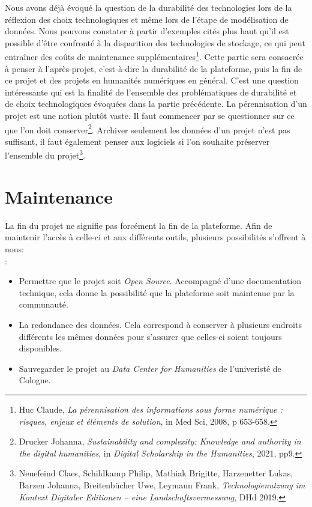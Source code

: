 Nous avons déjà évoqué la question de la durabilité des technologies lors de la réflexion des choix technologiques et même lors de l’étape de modélisation de données. Nous pouvons constater à partir d’exemples cités plus haut qu'il est possible d’être confronté à la disparition des technologies de stockage, ce qui peut entraîner des coûts de maintenance supplémentaires\footnote{Huc Claude, \textit{La pérennisation des informations sous forme numérique : risques, enjeux et éléments de solution}, in Med Sci, 2008, p 653-658.}. Cette partie sera consacrée à penser à l’après-projet, c’est-à-dire la durabilité de la plateforme, puis la fin de ce projet et des projets en humanités numériques en général. C’est une question intéressante qui est la finalité de l’ensemble des problématiques de durabilité et de choix technologiques évoquées dans la partie précédente.
La pérennisation d’un projet est une notion plutôt vaste. Il faut commencer par se questionner sur ce que l’on doit conserver\footnote{Drucker Johanna, \textit{Sustainability and complexity: Knowledge and authority in the digital humanities}, in \textit{Digital Scholarship in the Humanities}, 2021, pp9.}. Archiver seulement les données d’un projet n’est pas suffisant, il faut également penser aux logiciels si l’on souhaite préserver l’ensemble du projet\footnote{Neuefeind Claes, Schildkamp Philip, Mathiak Brigitte, Harzenetter Lukas, Barzen Johanna, Breitenbücher Uwe, Leymann Frank, \textit{Technologienutzung im Kontext Digitaler Editionen – eine Landschaftsvermessung}, DHd 2019.}.

\chapter{Maintenance}

La fin du projet ne signifie pas forcément la fin de la plateforme. Afin de maintenir l’accès à celle-ci et aux différents outils, plusieurs possibilités s’offrent à nous: \\: 
\begin{itemize}
\item Permettre que le projet soit \textit{Open Source}. Accompagné d'une documentation technique, cela donne la possibilité que la plateforme soit maintenue par la communauté.
\item La redondance des données. Cela correspond à conserver à plusieurs endroits différents les mêmes données pour s'assurer que celles-ci soient toujours disponibles.
\item Sauvegarder le projet au \textit{Data Center for Humanities} de l'univeristé de Cologne.
\end{itemize}

